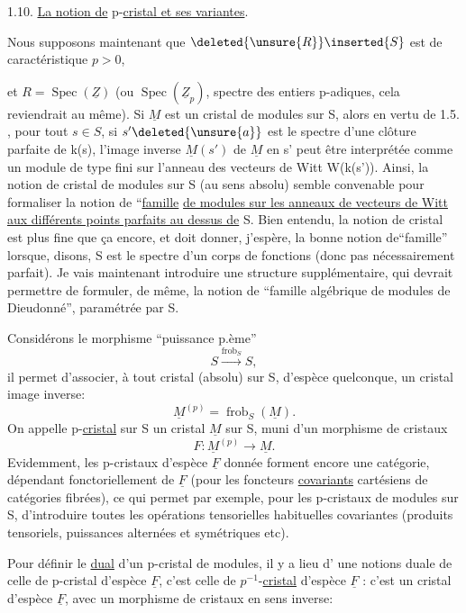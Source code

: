 1.10. \uline{La notion de} p-\uline{cristal et ses variantes}.

Nous supposons maintenant que $\deleted{\unsure{R}}\inserted{S}$ est de caractéristique $p>0$, 



et $R=\operatorname{Spec}(\underline Z)$ (ou $\operatorname{Spec}(\underline Z_p)$, spectre des entiers p-adiques, cela reviendrait au même). Si $\underline M$ est un cristal de modules sur S,  alors en vertu de 1.5. , pour tout $s\in S$, si $s'\deleted{\unsure{a}}$ est le spectre d'une clôture parfaite de k(s), l'image inverse $\underline M(s')$ de $\underline M$ en s' peut être interprétée comme un module de type fini sur l'anneau des vecteurs de Witt W(k(s')). Ainsi, la notion de cristal de modules sur S (au sens absolu) semble convenable pour formaliser la notion de ``\uline{famille}  \uline{de modules sur les anneaux de vecteurs de Witt aux différents points parfaits au dessus de} S. Bien entendu, la notion de cristal est plus fine que ça encore, et doit donner, j'espère, la bonne notion de``famille'' lorsque, disons, S est le spectre d'un corps de fonctions (donc pas nécessairement parfait). Je vais maintenant introduire une structure supplémentaire, qui  devrait permettre de formuler, de même, la notion de ``famille algébrique de modules de Dieudonné'', paramétrée par S.

Considérons le morphisme ``puissance p.ème''
\[
S\xrightarrow{\operatorname{frob}_S}S,
\]
il permet d'associer, à tout cristal (absolu) sur S, d'espèce quelconque, un cristal image inverse:
\[
\underline M^{(p)}=\operatorname{frob}_S(\underline M).
\]
On appelle p-\uline{cristal} sur S un cristal $\underline M$ sur S, muni d'un morphisme de cristaux
\[
F:\underline M^{(p)}\longrightarrow\underline M.
\]
Evidemment, les p-cristaux  d'espèce $\underline F$ donnée forment encore une catégorie, dépendant fonctoriellement de $\underline F$ (pour les foncteurs \uline{covariants} cartésiens de catégories fibrées), ce qui permet par exemple, pour les p-cristaux de modules sur S, d'introduire toutes les opérations tensorielles habituelles covariantes (produits tensoriels, puissances alternées et symétriques etc).

Pour  définir le \uline{dual} d'un p-cristal de modules, il y a lieu d' une notions duale de celle de p-cristal d'espèce $\underline F$, c'est celle de $p^{-1}$-\uline{cristal} d'espèce $\underline F$ : c'est un cristal d'espèce $\underline F$, avec un morphisme de cristaux en sens inverse:


